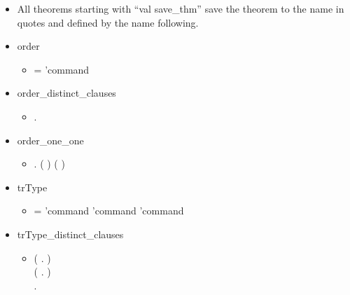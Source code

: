 \begin{itemize}
\item All theorems starting with “val save_thm” save the theorem to the name in
  quotes and defined by the name following.
\item order
  \begin{itemize}
    \item[]  =  'command \HOLTokenBar{} 
    \end{itemize}
  \item order_distinct_clauses
    \begin{itemize}
    \item[] \HOLTokenTurnstile{} \HOLSymConst{\HOLTokenForall{}}.   \HOLSymConst{\HOLTokenNotEqual{}} 
    \end{itemize}
    \item order_one_one
  \begin{itemize}
    \item[] \HOLTokenTurnstile{} \HOLSymConst{\HOLTokenForall{}} . (  \HOLSymConst{=}  ) \HOLSymConst{\HOLTokenEquiv{}} ( \HOLSymConst{=} )
    \end{itemize}
    \item trType
  \begin{itemize}
    \item[]  =  'command \HOLTokenBar{}  'command \HOLTokenBar{}  'command
    \end{itemize}
    \item trType_distinct_clauses
  \begin{itemize}
    \item[] \HOLTokenTurnstile{} (\HOLSymConst{\HOLTokenForall{}} .   \HOLSymConst{\HOLTokenNotEqual{}}  ) \HOLSymConst{\HOLTokenConj{}}\\ (\HOLSymConst{\HOLTokenForall{}} .   \HOLSymConst{\HOLTokenNotEqual{}}  ) \HOLSymConst{\HOLTokenConj{}}\\
   \HOLSymConst{\HOLTokenForall{}} .   \HOLSymConst{\HOLTokenNotEqual{}}  

\end{itemize}
\end{itemize}
